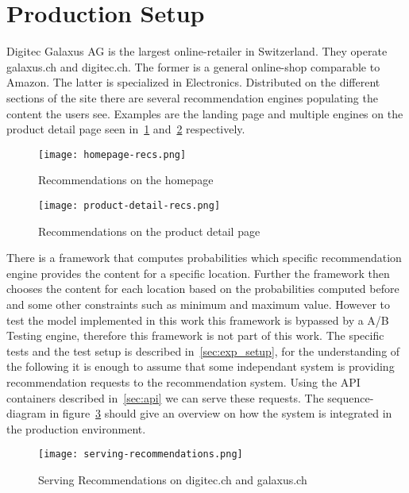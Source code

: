\section{Production Setup}
Digitec Galaxus AG is the largest online-retailer in Switzerland.
They operate galaxus.ch and digitec.ch. The former is a general online-shop comparable to Amazon. 
The latter is specialized in Electronics.
Distributed on the different sections of the site there are several recommendation engines populating the content the users see.
Examples are the landing page and multiple engines on the product detail page seen in~\ref{fig:homepage_recs} and~\ref{fig:product_detail_recs} respectively.

\begin{figure}[ht]
	\centering
	\captionsetup{width=0.8\textwidth}
    \texttt{[image: homepage-recs.png]}
    \caption{Recommendations on the homepage}
    \label{fig:homepage_recs}
\end{figure}

\begin{figure}[ht]
	\centering
	\captionsetup{width=0.8\textwidth}
    \texttt{[image: product-detail-recs.png]}
    \caption{Recommendations on the product detail page}
    \label{fig:product_detail_recs}
\end{figure}

There is a framework that computes probabilities which specific recommendation engine provides the content for a specific location.
Further the framework then chooses the content for each location based on the probabilities computed before and some other constraints such as minimum and maximum value.
However to test the model implemented in this work this framework is bypassed by a A/B Testing engine, therefore this framework is not part of this work.
The specific tests and the test setup is described in~\ref{sec:exp_setup}, for the understanding of the following it is enough to assume that some independant system is providing recommendation requests to the recommendation system.
Using the API containers described in~\ref{sec:api} we can serve these requests.
The sequence-diagram in figure~\ref{fig:serving_recs} should give an overview on how the system is integrated in the production environment.

\begin{figure}[ht]
	\centering
	\captionsetup{width=0.8\textwidth}
    \texttt{[image: serving-recommendations.png]}
    \caption{Serving Recommendations on digitec.ch and galaxus.ch}
    \label{fig:serving_recs}
\end{figure}

